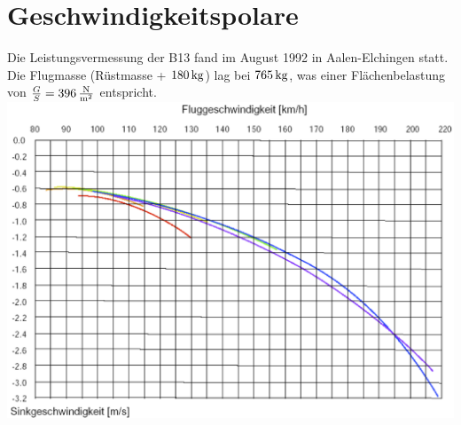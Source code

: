 \section{Geschwindigkeitspolare}
Die Leistungsvermessung der B13 fand im August 1992 in Aalen-Elchingen statt. Die Flugmasse (Rüstmasse + $\unit[180]{kg}$) lag bei $\unit[765]{kg}$, was einer Flächenbelastung von $\frac{G}{S}=\unit[396]{\frac{N}{m^2}}$ entspricht. \\
\newline
\includegraphics[width=\textwidth]{polare.png}
\newline
